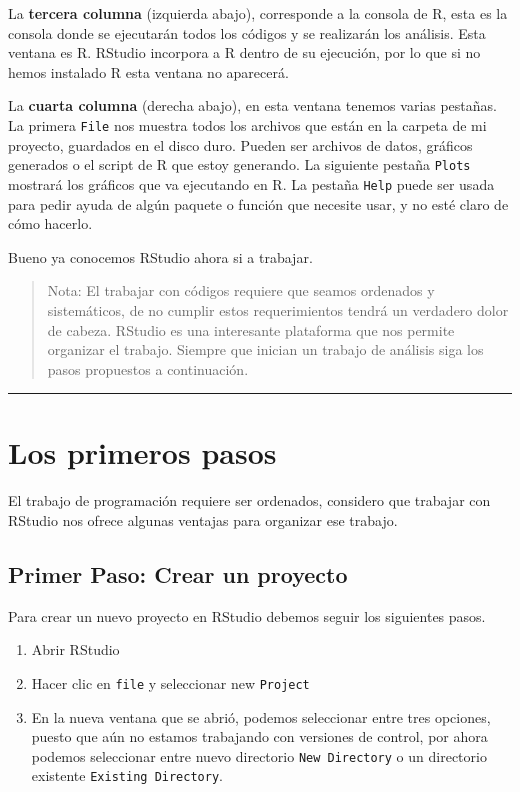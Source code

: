 \documentclass[]{article}
\providecommand{\tightlist}{%
  \setlength{\itemsep}{0pt}\setlength{\parskip}{0pt}}
\begin{document}
La \textbf{tercera columna} (izquierda abajo), corresponde a la consola
de R, esta es la consola donde se ejecutarán todos los códigos y se
realizarán los análisis. Esta ventana es R. RStudio incorpora a R dentro
de su ejecución, por lo que si no hemos instalado R esta ventana no
aparecerá.

La \textbf{cuarta columna} (derecha abajo), en esta ventana tenemos
varias pestañas. La primera \texttt{File} nos muestra todos los archivos
que están en la carpeta de mi proyecto, guardados en el disco duro.
Pueden ser archivos de datos, gráficos generados o el script de R que
estoy generando. La siguiente pestaña \texttt{Plots} mostrará los
gráficos que va ejecutando en R. La pestaña \texttt{Help} puede ser
usada para pedir ayuda de algún paquete o función que necesite usar, y
no esté claro de cómo hacerlo.

Bueno ya conocemos RStudio ahora si a trabajar.

\begin{quote}
Nota: El trabajar con códigos requiere que seamos ordenados y
sistemáticos, de no cumplir estos requerimientos tendrá un verdadero
dolor de cabeza. RStudio es una interesante plataforma que nos permite
organizar el trabajo. Siempre que inician un trabajo de análisis siga
los pasos propuestos a continuación.
\end{quote}

\begin{center}\rule{0.5\linewidth}{\linethickness}\end{center}

\section{Los primeros pasos}\label{los-primeros-pasos}

El trabajo de programación requiere ser ordenados, considero que
trabajar con RStudio nos ofrece algunas ventajas para organizar ese
trabajo.

\subsection{Primer Paso: Crear un
proyecto}\label{primer-paso-crear-un-proyecto}

Para crear un nuevo proyecto en RStudio debemos seguir los siguientes
pasos.

\begin{enumerate}
\def\labelenumi{\arabic{enumi}.}
\tightlist
\item
  Abrir RStudio
\item
  Hacer clic en \texttt{file} y seleccionar new \texttt{Project}
\item
  En la nueva ventana que se abrió, podemos seleccionar entre tres
  opciones, puesto que aún no estamos trabajando con versiones de
  control, por ahora podemos seleccionar entre nuevo directorio
  \texttt{New\ Directory} o un directorio existente
  \texttt{Existing\ Directory}.
\end{enumerate}
\end{document}
